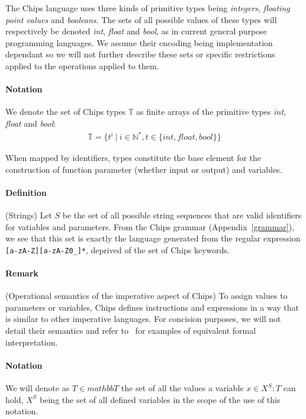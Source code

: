\documentclass{article}
\begin{document}
The Chips language uses three kinds of primitive types being \emph{integers}, \emph{floating point values} and \emph{booleans}. The sets of all possible values of these types will respectively be denoted \emph{int}, \emph{float} and \emph{bool}, as in current general purpose programming languages. We assume their encoding being implementation dependant so we will not further describe these sets or specific restrictions applied to the operations applied to them.

\paragraph{Notation} We denote the set of Chips types $\mathbb{T}$ as finite arrays of the primitive types \emph{int}, \emph{float} and \emph{bool}:
\begin{align*}
    \mathbb{T} = \{t^i~|~i\in\mathbb{N}^*, t\in\{int,float,bool\}\}
\end{align*}

When mapped by identifiers, types constitute the base element for the construction of function parameter (whether input or output) and variables.

\paragraph{Definition} (Strings) Let $S$ be the set of all possible string sequences that are valid identifiers for vatiables and parameters. From the Chips grammar (Appendix~\ref{grammar}), we see that this set is exactly the language generated from the regular expression \texttt{[a-zA-Z][a-zA-Z0\_]*}, deprived of the set of Chips keywords. 

\paragraph{Remark} (Operational semantics of the imperative aspect of Chips) To assign values to parameters or variables, Chips defines instructions and expressions in a way that is similar to other imperative languages. For concision purposes, we will not detail their semantics and refer to~\cite{plotkin_structural_2004} for examples of equivalent formal interpretation.

\paragraph{Notation} We will denote as $T \in mathbb{T}$ the set of all the values a variable $x \in X^S : T$ can hold, $X^S$ being the set of all defined variables in the scope of the use of this notation.
\end{document}
